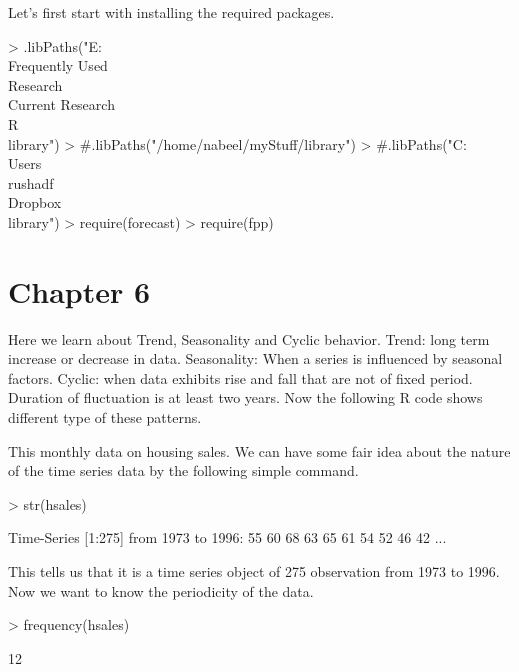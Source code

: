 \documentclass{article}
\begin{document}


Let's first start with installing  the required packages.
\begin{Schunk}
\begin{Sinput}
> .libPaths("E:\\Frequently Used\\Research\\Current Research\\R\\library")
> #.libPaths("/home/nabeel/myStuff/library")
> #.libPaths("C:\\Users\\rushadf\\Dropbox\\library")
> require(forecast)
> require(fpp)
\end{Sinput}
\end{Schunk}

\section{Chapter 6}
 Here we learn about Trend, Seasonality and Cyclic behavior.  
 Trend: long term increase or decrease in data.
Seasonality: When a series is influenced by seasonal factors.
 Cyclic: when data exhibits rise and fall that are not of  fixed period.  Duration of fluctuation is at least two years. Now the following R code shows different type of these patterns.
 
 This monthly data on housing sales. We can have some fair idea about the nature
 of the time series data by the following simple command. 
 
\begin{Schunk}
\begin{Sinput}
> str(hsales)
\end{Sinput}
\begin{Soutput}
 Time-Series [1:275] from 1973 to 1996: 55 60 68 63 65 61 54 52 46 42 ...
\end{Soutput}
\end{Schunk}
This tells us that it is a time series object of 275 observation from 1973 to 1996. Now we want to know the periodicity of the data.

\begin{Schunk}
\begin{Sinput}
> frequency(hsales)
\end{Sinput}
\begin{Soutput}
[1] 12
\end{Soutput}
\end{Schunk}
\end{document}
